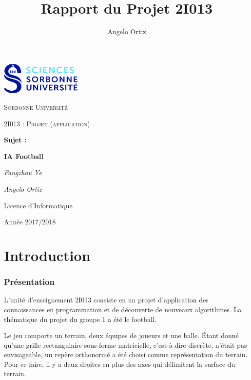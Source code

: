 \documentclass[12pt,a4paper]{article}
\author{Angelo Ortiz}
\title{Rapport du Projet 2I013}
\begin{document}
\begin{titlepage}
  \centering
  \includegraphics[width=0.30\textwidth]{../img/logo.jpg}\par\vspace{1cm}
  {\scshape\LARGE Sorbonne Universit\'e\par}
  \vspace{1cm}
  {\scshape\Large 2I013 : Projet (application)\par}
  \vspace{1.5cm}
  {\Large \bfseries Sujet :\par}
  {\huge\bfseries IA Football\par}
  \vspace{2cm}
  {\Large\itshape Fangzhou Ye\par}
  {\Large\itshape Angelo Ortiz\par}
  \vfill
  
  {\large Licence d'Informatique\par}
  {\large Ann\'ee 2017/2018\par}
\end{titlepage}
 
\tableofcontents
\listoffigures
\newpage
  
\part*{Introduction}
\section*{Pr\'esentation}
L'unit\'e d'enseignement 2I013 consiste en un projet d'application des 
connaissances en programmation et de d\'ecouverte de nouveaux algorithmes. La 
th\'ematique du 
projet du groupe 1 a \'et\'e le football.

Le jeu comporte un terrain, deux \'equipes de joueurs et une 
balle. \'Etant donn\'e qu'une grille rectangulaire sous forme matricielle, 
c'est-\`a-dire discr\`ete, n'\'etait pas envisageable, un rep\`ere 
orthonorm\'e a \'et\'e choisi comme repr\'esentation du terrain. Pour ce faire, 
il y a deux droites en plus des axes qui d\'elimitent la surface du terrain.
\end{document}
